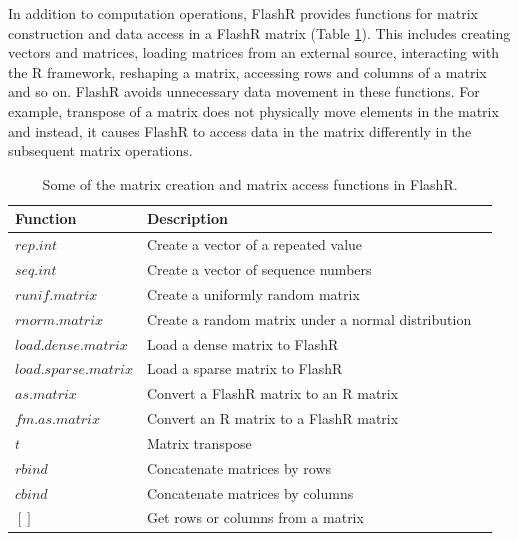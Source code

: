 In addition to computation operations, FlashR provides functions for matrix
construction and data access in a FlashR matrix (Table \ref{tbl:utility}). This
includes creating vectors and matrices, loading matrices from an external source,
interacting with the R framework, reshaping a matrix, accessing rows and columns of
a matrix and so on. FlashR avoids unnecessary data movement in these functions.
For example, transpose of a matrix does not physically move elements in the matrix
and instead, it causes FlashR to access data in the matrix differently in
the subsequent matrix operations.

\begin{table}
\begin{center}
\caption{Some of the matrix creation and matrix access functions in FlashR.}
\vspace{-10pt}
\footnotesize
\begin{tabular}{|l|l|l|}
\hline
Function & Description \\
\hline
$rep.int$ & Create a vector of a repeated value \\
$seq.int$ & Create a vector of sequence numbers \\
$runif.matrix$ & Create a uniformly random matrix  \\
$rnorm.matrix$ & Create a random matrix under a normal distribution \\
\hline
$load.dense.matrix$ & Load a dense matrix to FlashR \\
$load.sparse.matrix$ & Load a sparse matrix to FlashR \\
\hline
$as.matrix$ & Convert a FlashR matrix to an R matrix \\
$fm.as.matrix$ & Convert an R matrix to a FlashR matrix \\
\hline
$t$ & Matrix transpose \\
$rbind$ & Concatenate matrices by rows \\
$cbind$ & Concatenate matrices by columns \\
$[]$ & Get rows or columns from a matrix \\
\hline
\end{tabular}
\normalsize
\label{tbl:utility}
\end{center}
\end{table}

